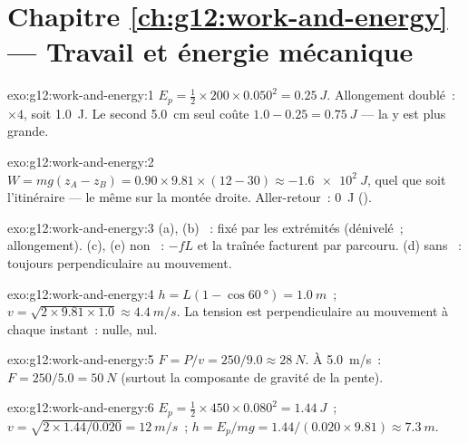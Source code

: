 \section*{Chapitre \ref{ch:g12:work-and-energy} --- Travail et énergie mécanique}

\begin{solution}{exo:g12:work-and-energy:1}
$E_p = \tfrac12 \times 200 \times 0.050^2 = \qty{0.25}{J}$. Allongement
doublé~: $\times 4$, soit \qty{1.0}{J}. Le second \qty{5.0}{cm}
seul coûte $1.0 - 0.25 = \qty{0.75}{J}$ --- la  y est plus
grande.
\end{solution}

\begin{solution}{exo:g12:work-and-energy:2}
$W = mg(z_A - z_B) = 0.90 \times 9.81 \times (12 - 30) \approx
\qty{-1.6e2}{J}$, quel que soit l'itinéraire --- le même sur la
montée droite. Aller-retour~: \qty{0}{J} ().
\end{solution}

\begin{solution}{exo:g12:work-and-energy:3}
(a), (b) ~:  fixé
par les extrémités (dénivelé~; allongement). (c), (e)
non ~: $-fL$ et la traînée facturent par
 parcouru. (d) sans ~: toujours
perpendiculaire au mouvement.
\end{solution}

\begin{solution}{exo:g12:work-and-energy:4}
$h = L(1 - \cos\qty{60}{\degree}) = \qty{1.0}{m}$~;
$v = \sqrt{2 \times 9.81 \times 1.0} \approx \qty{4.4}{m/s}$. La
tension est perpendiculaire au mouvement à chaque
instant~:  nulle,  nul.
\end{solution}

\begin{solution}{exo:g12:work-and-energy:5}
$F = P/v = 250/9.0 \approx \qty{28}{N}$. À \qty{5.0}{m/s}~:
$F = 250/5.0 = \qty{50}{N}$ (surtout la composante de gravité de la
pente).
\end{solution}

\begin{solution}{exo:g12:work-and-energy:6}
$E_p = \tfrac12 \times 450 \times 0.080^2 = \qty{1.44}{J}$~;
$v = \sqrt{2 \times 1.44/0.020} = \qty{12}{m/s}$~;
$h = E_p/mg = 1.44/(0.020 \times 9.81) \approx \qty{7.3}{m}$.
\end{solution}

